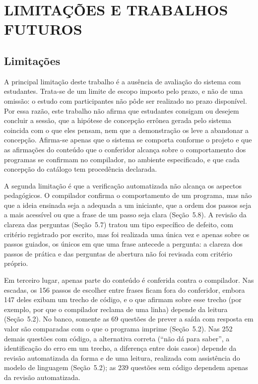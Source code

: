 
\chapter{\texorpdfstring{\mbox{LIMITAÇÕES} \mbox{E} \mbox{TRABALHOS} \mbox{FUTUROS}}{LIMITAÇÕES E TRABALHOS FUTUROS}}\label{cap:7}

\section{Limitações}

A principal limitação deste trabalho é a ausência de avaliação do sistema com estudantes. Trata-se de um limite de escopo imposto pelo prazo, e não de uma omissão: o estudo com participantes não pôde ser realizado no prazo disponível. Por essa razão, este trabalho não afirma que estudantes consigam ou desejem concluir a sessão, que a hipótese de concepção errônea gerada pelo sistema coincida com o que eles pensam, nem que a demonstração os leve a abandonar a concepção. Afirma-se apenas que o sistema se comporta conforme o projeto e que as afirmações do conteúdo que o conferidor alcança sobre o comportamento dos programas se confirmam no compilador, no ambiente especificado, e que cada concepção do catálogo tem procedência declarada.

A segunda limitação é que a verificação automatizada não alcança os aspectos pedagógicos. O compilador confirma o comportamento de um programa, mas não que a ideia ensinada seja a adequada a um iniciante, que a ordem dos passos seja a mais acessível ou que a frase de um passo seja clara (Seção~5.8). A revisão da clareza das perguntas (Seção~5.7) tratou um tipo específico de defeito, com critério registrado por escrito, mas foi realizada uma única vez e apenas sobre os passos guiados, os únicos em que uma frase antecede a pergunta: a clareza dos passos de prática e das perguntas de abertura não foi revisada com critério próprio.

Em terceiro lugar, apenas parte do conteúdo é conferida contra o compilador. Nas escadas, os 156 passos de escolher entre frases ficam fora do conferidor, embora 147 deles exibam um trecho de código, e o que afirmam sobre esse trecho (por exemplo, por que o compilador reclama de uma linha) depende da leitura (Seção~5.2). No banco, somente as 69 questões de prever a saída com resposta em valor são comparadas com o que o programa imprime (Seção~5.2). Nas 252 demais questões com código, a alternativa correta (``não dá para saber'', a identificação do erro em um trecho, a diferença entre dois casos) depende da revisão automatizada da forma e de uma leitura, realizada com assistência do modelo de linguagem (Seção~5.2); as 239 questões sem código dependem apenas da revisão automatizada.

